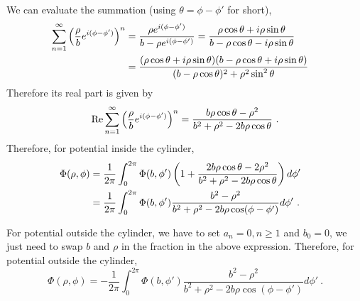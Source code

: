 \documentclass[12pt]{article}
\begin{document}
We can evaluate the summation (using $\theta = \phi - \phi'$ for short),
\begin{align}
    \sum_{n=1}^\infty \left(\frac{\rho}{b} e^{i(\phi - \phi')}\right)^n &= \frac{\rho e^{i(\phi - \phi')}}{b - \rho e^{i(\phi - \phi')}} = \frac{\rho \cos \theta + i \rho \sin\theta}{b - \rho \cos\theta - i \rho \sin \theta}\cr
    & = \frac{(\rho \cos \theta + i \rho \sin \theta) (b - \rho \cos \theta + i \rho \sin \theta)}{(b-\rho\cos\theta)^2 + \rho^2 \sin^2\theta}
\end{align}
Therefore its real part is given by
\begin{equation}
    {\rm Re} \sum_{n=1}^\infty \left(\frac{\rho}{b} e^{i(\phi - \phi')}\right)^n = \frac{b \rho \cos \theta - \rho^2}{b^2 + \rho^2 - 2b\rho \cos\theta}~.
\end{equation}
Therefore, for potential inside the cylinder,
\begin{align}
    \Phi(\rho, \phi) &= \frac{1}{2\pi} \int_0^{2\pi} \Phi(b, \phi')\left(1 + \frac{2 b\rho \cos \theta - 2\rho^2}{b^2 + \rho^2 - 2 b\rho \cos\theta}\right)d\phi'\cr
    &= \frac{1}{2\pi} \int_0^{2\pi} \Phi(b, \phi') \frac{b^2 - \rho^2}{b^2 + \rho^2 - 2b\rho \cos(\phi - \phi')} d\phi'~.
\end{align}

For potential outside the cylinder, we have to set $a_n = 0, n\ge 1$ and $b_0 = 0$, we just need to swap $b$ and $\rho$ in the fraction in the above expression. Therefore, for potential outside the cylinder,
\begin{equation}
    \Phi(\rho, \phi) = -\frac{1}{2\pi} \int_0^{2\pi} \Phi(b, \phi') \frac{b^2 - \rho^2}{b^2 + \rho^2 - 2b\rho \cos(\phi - \phi')} d\phi'~.
\end{equation}
\end{document}
